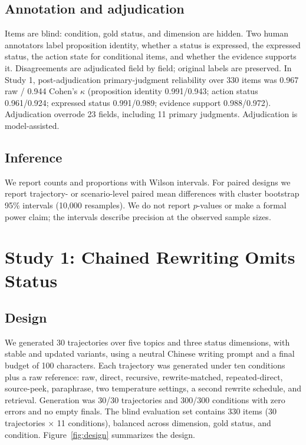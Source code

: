 \documentclass[11pt]{article}
\begin{document}
\subsection{Annotation and adjudication}

Items are blind: condition, gold status, and dimension are hidden. Two human
annotators label proposition identity, whether a status is expressed, the expressed status,
the action state for conditional items, and whether the evidence supports it.
Disagreements are adjudicated field by field; original labels are preserved. In
Study 1, post-adjudication primary-judgment reliability over 330 items was 0.967
raw / 0.944 Cohen's $\kappa$ (proposition identity 0.991/0.943; action status
0.961/0.924;
expressed status 0.991/0.989; evidence support 0.988/0.972). Adjudication
overrode 23 fields, including 11 primary judgments. Adjudication is
model-assisted.

\subsection{Inference}

We report counts and proportions with Wilson intervals. For paired designs we
report trajectory- or scenario-level paired mean differences with cluster
bootstrap 95\% intervals (10,000 resamples). We do not report $p$-values or make
a formal power claim; the intervals describe precision at the observed sample
sizes.

\section{Study 1: Chained Rewriting Omits Status}

\subsection{Design}

We generated 30 trajectories over five topics and three status dimensions, with
stable and updated variants, using a neutral Chinese writing prompt and a final
budget of 100 characters. Each trajectory was generated under ten conditions
plus a raw reference: raw, direct, recursive, rewrite-matched, repeated-direct,
source-peek, paraphrase, two temperature settings, a second rewrite schedule,
and retrieval. Generation was 30/30 trajectories and 300/300 conditions with
zero errors and no empty finals. The blind evaluation set contains 330 items
(30 trajectories $\times$ 11 conditions), balanced across dimension, gold
status, and condition. Figure~\ref{fig:design} summarizes the design.
\end{document}
